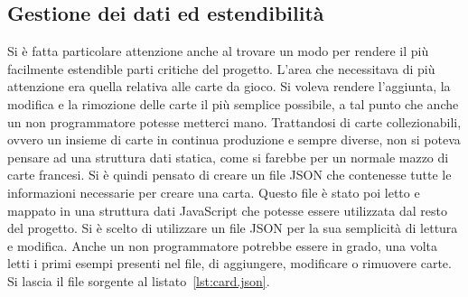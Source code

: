 \subsection{Gestione dei dati ed estendibilità}
Si è fatta particolare attenzione anche al trovare un modo per rendere il più facilmente estendible parti critiche del progetto. L'area che necessitava di più attenzione era quella
relativa alle carte da gioco. Si voleva rendere l'aggiunta, la modifica e la rimozione delle carte il più semplice possibile, a tal punto che anche un non programmatore potesse 
metterci mano. Trattandosi di carte collezionabili, ovvero un insieme di carte in continua produzione e sempre diverse, non si poteva pensare ad una struttura dati statica, come si 
farebbe per un normale mazzo di carte francesi. Si è quindi pensato di creare un file JSON che contenesse tutte le informazioni necessarie per creare una carta. Questo file è stato
poi letto e mappato in una struttura dati JavaScript che potesse essere utilizzata dal resto del progetto. Si è scelto di utilizzare un file JSON per la sua semplicità di lettura e
modifica. Anche un non programmatore potrebbe essere in grado, una volta letti i primi esempi presenti nel file, di aggiungere, modificare o rimuovere carte. Si lascia il
file sorgente al listato~\ref{lst:card.json}.
